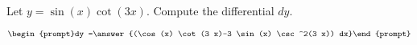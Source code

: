 \documentclass{ximera}
\author{Bart Snapp}
\begin{document}
\begin{exercise}

Let $y= \sin (x) \cot (3 x)$. Compute the differential $dy$.

\[
\begin{prompt}dy =\answer{(\cos (x) \cot (3 x)-3 \sin (x) \csc ^2(3 x)) dx}\end{prompt}
\]
\end{exercise}
\end{document}
